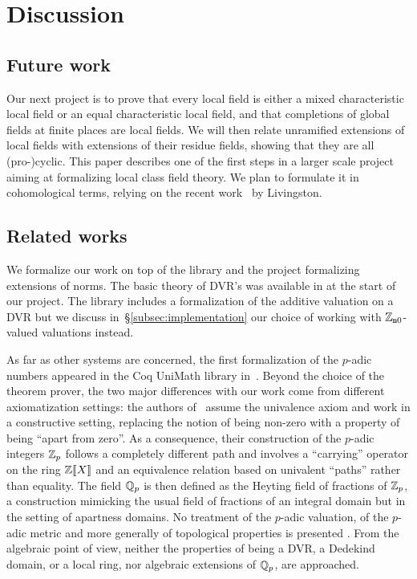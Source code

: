 \documentclass[sigplan,screen]{acmart}
\begin{document}
\section{Discussion}\label{sec:conclusion}

\subsection{Future work}\label{subsec:future_work}

Our next project is to prove that every local field is either a mixed characteristic local field or an equal characteristic local field, and that completions of global fields at finite places are local fields. We will then relate unramified extensions of local fields with extensions of their residue fields, showing that they are all (pro-)cyclic. This paper describes one of the first steps in a larger scale project aiming at formalizing local class field theory. We plan to formulate it in cohomological terms, relying on the recent work~\cite{Liv23} by Livingston.

\subsection{Related works}\label{subsec:related_work}
We formalize our work on top of the \lean library \mathlib and the \lean project \cite{deF23} formalizing extensions of norms. The basic theory of DVR's was available in \mathlib at the start of our project. The library includes a formalization of the additive valuation on a DVR but we discuss in~\S\ref{subsec:implementation} our choice of working with $\mathbb{Z}_{\mathtt{m}0}$-valued valuations instead.

As far as other systems are concerned, the first formalization of the $p$-adic numbers appeared in the Coq UniMath library in~\cite{padicsCoq}. Beyond the choice of the theorem prover, the two major differences with our work come from different axiomatization settings: the authors of~\cite{padicsCoq} assume the univalence axiom and work in a constructive setting, replacing the notion of being non-zero with a property of being ``apart from zero''. As a consequence, their construction of the $p$-adic integers $\mathbb{Z}_p$ follows a completely different path and involves a ``carrying'' operator on the ring $\mathbb{Z}{[\![X]\!]}$ and an equivalence relation based on univalent ``paths'' rather than equality. The field $\mathbb{Q}_p$ is then defined as the Heyting field of fractions of $\mathbb{Z}_p$, a construction mimicking the usual field of fractions of an integral domain but in the setting of apartness domains. No treatment of the $p$-adic valuation, of the $p$-adic metric and more generally of topological properties is presented \ibid. From the algebraic point of view, neither the properties of being a DVR, a Dedekind domain, or a local ring, nor algebraic extensions of $\mathbb{Q}_p$, are approached.
\end{document}
